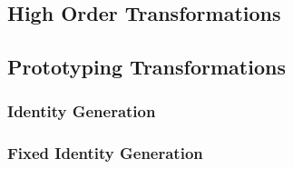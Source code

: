 


\clearpage
\subsection{High Order Transformations}



\clearpage
\subsection{Prototyping Transformations}

\clearpage
\subsubsection{Identity Generation}

\clearpage
\subsubsection{Fixed Identity Generation}

